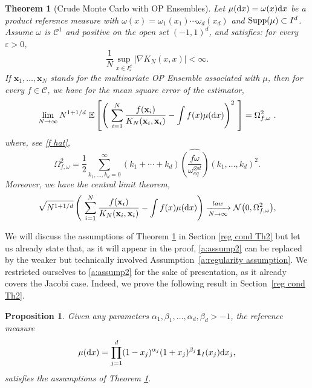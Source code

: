 \documentclass[a4paper,11pt]{article}
\numberwithin{equation}{section}
\newtheorem{theorem}{Theorem}[]
\newtheorem{proposition}[]{Proposition}
\theoremstyle{definition}
\newcommand{\rev}[1]{#1}
\newcommand{\eq}{\begin{equation}}
\newcommand{\qe}{\end{equation}}
\newcommand{\Supp}{{\rm Supp}}
\newcommand{\bs}{\boldsymbol}
\newcommand{\bv}{\mathbf}
\renewcommand{\epsilon}{\varepsilon}
\renewcommand{\d}{ {\rm d}}
\begin{document}
\begin{theorem}[\rev{Crude Monte Carlo with OP Ensembles}]
\label{DPPMC Th1}
Let $\mu(\d x)=\omega(x)\d x$ be a product reference measure with $\omega(x)=\omega_1(x_1)\cdots\omega_d(x_d)$ and  $\Supp(\mu)\subset I^d$. Assume $\omega$ is $\mathscr C^1$ and positive on the open set $(-1,1)^d$, and satisfies: \rev{for every $\epsilon>0$,
\eq
\label{a:assump2}
\frac1N\sup_{x\in I_\epsilon^d}\left|\nabla K_N(x,x)\right|<\infty.
\qe}
If $\bv x_1,\ldots,\bv x_N$ stands for the multivariate OP Ensemble associated with $\mu$, then for every $f\in\mathscr C$,
we have for the mean square error of the estimator,
\eq
\lim_{N\to\infty}N^{1+1/d}\ \mathbb E\left[\left(\ \sum_{i=1}^N \frac{f(\bv x_i)}{K_N(\bv x_i,\bv x_i)}- \int f(x)\mu(\d x)\right)^2\ \right]=\Omega_{f,\omega}^2\ .
\qe
where, see \eqref{f hat},
\eq
\label{omega f}
\Omega_{f,\omega}^2= \frac1{2}\sum_{k_1,\ldots,k_d=0}^\infty (k_1+\cdots+k_d)  \widehat{ \left(\frac{f \omega}{\omega_{eq}^{\otimes d}}\right)}(k_1,\ldots,k_d)^2.
\qe
Moreover, we have the central limit theorem,
$$
\sqrt{N^{1+1/d}}\left(\ \sum_{i=1}^N \frac{f(\bv x_i)}{K_N(\bv x_i,\bv x_i)}- \int f(x)\mu(\d x)\right)\xrightarrow[N\to\infty]{law } \mathcal N\big(0,\Omega_{f,\omega}^2\big),
$$
\end{theorem}

\rev{We will discuss the assumptions of Theorem \ref{DPPMC Th1} in Section \ref{reg
  cond Th2} but let us already state that, as it will appear in the proof, \eqref{a:assump2}  can be replaced by the weaker  but technically involved Assumption~\ref{a:regularity assumption}. We restricted ourselves to \eqref{a:assump2} for the sake of presentation, as it already covers the Jacobi case. Indeed, we prove the following result in Section~\ref{reg cond Th2}.}
\begin{proposition}
\label{Jacobi = regular}
Given any parameters $\alpha_1,\beta_1,\ldots,\alpha_d,\beta_d>-1$, the
reference measure
\eq
\label{Jacobi measure}
\mu(\d x)=\prod_{j=1}^d(1-x_j)^{\alpha_j}(1+x_j)^{\beta_j} \bs 1_{I}(x_j)\d x_j,
\qe
 satisfies the assumptions of Theorem \ref{DPPMC Th1}.
\end{proposition}
\end{document}
